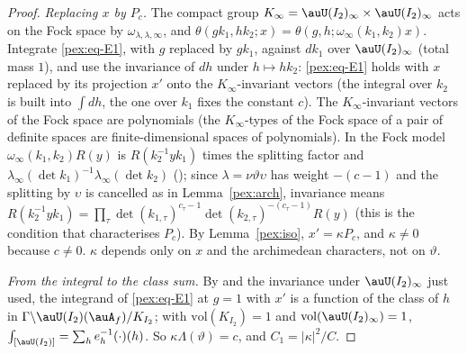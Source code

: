 \documentclass[10pt]{amsart}
\theoremstyle{definition}
\theoremstyle{remark}
\begin{document}
\begin{proof}
\emph{Replacing $x$ by $P_c$.} The compact group $K_\infty=\auU(I_2)_\infty\times\auU(I_2)_\infty$ acts on
the Fock space by $\omega_{\lambda,\lambda,\infty}$, and $\theta(g k_1,hk_2;x)=\theta(g,h;\omega_\infty
(k_1,k_2)x)$. Integrate \eqref{pex:eq-E1}, with $g$ replaced by $gk_1$, against $dk_1$ over
$\auU(I_2)_\infty$ (total mass $1$), and use the invariance of $dh$ under $h\mapsto hk_2$: \eqref{pex:eq-E1}
holds with $x$ replaced by its projection $x'$ onto the $K_\infty$-invariant vectors (the integral over
$k_2$ is built into $\int dh$, the one over $k_1$ fixes the constant $c$). The $K_\infty$-invariant
vectors of the Fock space are polynomials (the $K_\infty$-types of the Fock space of a pair of definite
spaces are finite-dimensional spaces of polynomials). In the Fock model $\omega_\infty(k_1,k_2)R(y)$ is
$R(k_2^{-1}yk_1)$ times the splitting factor and $\lambda_\infty(\det k_1)^{-1}\lambda_\infty(\det k_2)$
({\cite[\S2.3]{P53}}); since $\lambda=\nu\vartheta\upsilon$ has weight $-(c-1)$ and the splitting by
$\upsilon$ is cancelled as in Lemma~\ref{pex:arch}, invariance means $R(k_2^{-1}yk_1)=\prod_\tau\det
(k_{1,\tau})^{c_\tau-1}\det(k_{2,\tau})^{-(c_\tau-1)}R(y)$ (this is the condition that characterises $P_c$). By Lemma~\ref{pex:iso}, $x'=\kappa P_c$, and $\kappa\ne0$
because $c\ne0$. $\kappa$ depends only on $x$ and the archimedean characters, not on $\vartheta$.

\emph{From the integral to the class sum.} By {\cite[Lemma~2.9]{P53}} and the invariance under
$\auU(I_2)_\infty$ just used, the integrand of \eqref{pex:eq-E1} at $g=1$ with $x'$ is a function of the
class of $h$ in $\Gamma\backslash\auU(I_2)(\auA_f)/K_{I_2}$; with $\mathrm{vol}(K_{I_2})=1$ and
$\mathrm{vol}(\auU(I_2)_\infty)=1$, $\int_{[\auU(I_2)]}=\sum_h e_h^{-1}(\cdot)(h)$. So
$\kappa\Lambda(\vartheta)=c$, and $C_1=|\kappa|^2/C$.
\end{proof}
\end{document}
